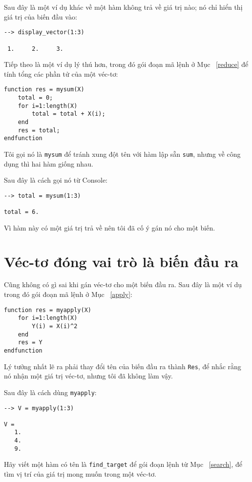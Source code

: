 \documentclass[12pt]{book}
\begin{document}
Sau đây là một ví dụ khác về một hàm không trả về giá trị nào;
nó chỉ hiển thị giá trị của biến đầu vào:

\begin{verbatim}
--> display_vector(1:3)

 1.     2.     3.
\end{verbatim}
%
Tiếp theo là một ví dụ lý thú hơn, trong đó gói đoạn mã lệnh ở
Mục~ \ref{reduce} để tính tổng các phần tử của một véc-tơ:

\begin{verbatim}
function res = mysum(X)
    total = 0;
    for i=1:length(X)
        total = total + X(i);
    end
    res = total;
endfunction
\end{verbatim}
%
Tôi gọi nó là {\tt mysum} để tránh xung đột tên với hàm lập sẵn
{\tt sum}, nhưng về công dụng thì hai hàm giống nhau.

Sau đây là cách gọi nó từ Console:

\begin{verbatim}
--> total = mysum(1:3)

total = 6.
\end{verbatim}
%
Vì hàm này có một giá trị trả về nên tôi đã cố ý gán nó cho một
biến.


\section{Véc-tơ đóng vai trò là biến đầu ra}

Cũng không có gì sai khi gán véc-tơ cho một biến đầu ra. Sau đây
là một ví dụ trong đó gói đoạn mã lệnh ở Mục~ \ref{apply}:

\begin{verbatim}
function res = myapply(X)
    for i=1:length(X)
        Y(i) = X(i)^2
    end
    res = Y
endfunction
\end{verbatim}
%
Lý tưởng nhất lẽ ra phải thay đổi tên của biến đầu ra thành
{\tt Res}, để nhắc rằng nó nhận một giá trị véc-tơ, nhưng
tôi đã không làm vậy.

Sau đây là cách dùng {\tt myapply}:

\begin{verbatim}
--> V = myapply(1:3)

V = 
   1.     
   4.    
   9.
\end{verbatim}
%
\begin{ex}
Hãy viết một hàm có tên là \verb#find_target# để gói đoạn lệnh
từ Mục~ \ref{search}, để tìm vị trí của giá trị mong muốn trong
một véc-tơ.
\end{ex}
\end{document}

